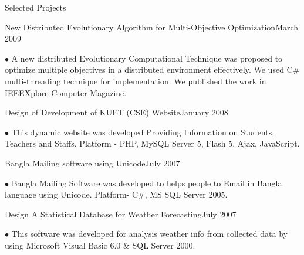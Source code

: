 \documentclass{resume} %
\begin{document}
\begin{rSection}{Selected Projects}

\begin{rSubsection}{New Distributed Evolutionary Algorithm for Multi-Objective Optimization}{March 2009}{}{}
\item[$\bullet$] A new distributed Evolutionary Computational Technique was proposed to optimize multiple objectives in a distributed environment effectively. We used C\# multi-threading technique for implementation. We published the work in IEEEXplore Computer Magazine.	
\end{rSubsection}

\begin{rSubsection}{Design of Development of KUET (CSE) Website}{January 2008}{}{}	
\item[$\bullet$] This dynamic website was developed Providing Information on Students, Teachers and
Staffs. Platform - PHP, MySQL Server 5, Flash 5, Ajax, JavaScript.
\end{rSubsection}

\begin{rSubsection}{Bangla Mailing software using Unicode}{July 2007}{}{}
\item[$\bullet$] Bangla Mailing Software was developed to helps people to Email in Bangla language using
Unicode. Platform- C\#, MS SQL Server 2005.
\end{rSubsection}

\begin{rSubsection}{Design A Statistical Database for Weather Forecasting}{July 2007}{}{}				
\item[$\bullet$] This software was developed for analysis weather info from collected data by using
Microsoft Visual Basic 6.0 \& SQL Server 2000.
\end{rSubsection}


\end{rSection}
\end{document}
